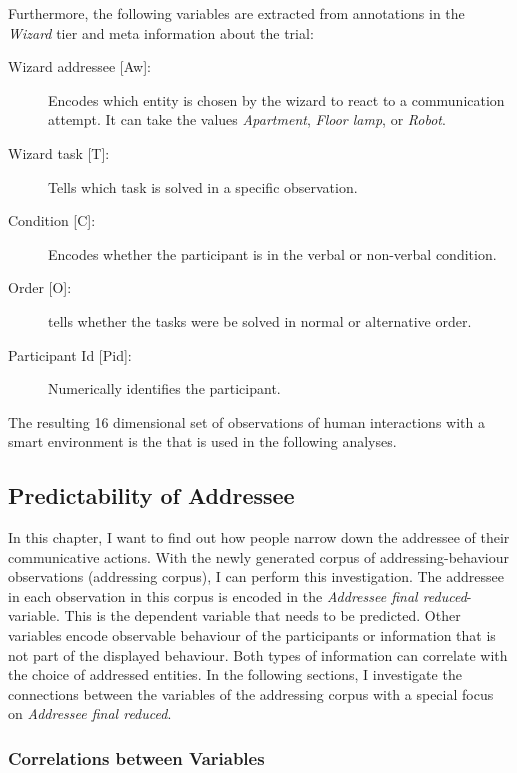 Furthermore, the following variables are extracted from annotations in the \emph{Wizard} tier and meta information about the trial:
\begin{description}
    \item[{Wizard \gls{addressee} [Aw]:}] Encodes which entity is chosen by the \gls{wizard} to react to a communication attempt.
    It can take the values \emph{Apartment}, \emph{Floor lamp}, or \emph{Robot}.
    \item[{Wizard task [T]:}] Tells which task is solved in a specific observation.
    \item[{Condition [C]:}] Encodes whether the participant is in the verbal or non-verbal condition.
    \item[{Order [O]:}] tells whether the tasks were be solved in normal or alternative order.
    \item[{Participant Id [Pid]:}] Numerically identifies the participant.
\end{description}
The resulting 16 dimensional set of observations of human interactions with a \gls{smart environment} is the that is used in the following analyses.

\subsection{Predictability of Addressee}\label{sec:addressee-analysis}

In this chapter, I want to find out how \naive{} people narrow down the \gls{addressee} of their communicative actions.
With the newly generated corpus of addressing-behaviour observations (\gls{addressing corpus}), I can perform this investigation.
The \gls{addressee} in each observation in this corpus is encoded in the \emph{Addressee final reduced}-variable.
This is the dependent variable that needs to be predicted.
Other variables encode observable behaviour of the participants or information that is not part of the displayed behaviour.
Both types of information can correlate with the choice of addressed entities.
In the following sections, I investigate the connections between the variables of the \gls{addressing corpus} with a special focus on \emph{Addressee final reduced}.

\subsubsection{Correlations between Variables}

